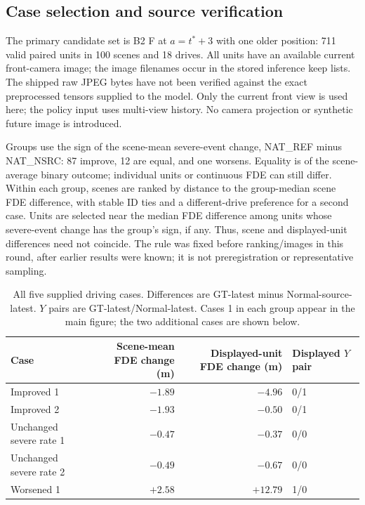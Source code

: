 \subsection{Case selection and source verification}
The primary candidate set is B2 F at $a=t^*+3$ with one older position: 711 valid paired units in 100 scenes and 18 drives. All units have an available current front-camera image; the image filenames occur in the stored inference keep lists. The shipped raw JPEG bytes have not been verified against the exact preprocessed tensors supplied to the model. Only the current front view is used here; the policy input uses multi-view history. No camera projection or synthetic future image is introduced.

Groups use the sign of the scene-mean severe-event change, NAT\_REF minus NAT\_NSRC: 87 improve, 12 are equal, and one worsens. Equality is of the scene-average binary outcome; individual units or continuous FDE can still differ. Within each group, scenes are ranked by distance to the group-median scene FDE difference, with stable ID ties and a different-drive preference for a second case. Units are selected near the median FDE difference among units whose severe-event change has the group's sign, if any. Thus, scene and displayed-unit differences need not coincide. The rule was fixed before ranking/images in this round, after earlier results were known; it is not preregistration or representative sampling.

\begin{table}[ht]
\centering\small
\caption{All five supplied driving cases. Differences are GT-latest minus Normal-source-latest. $Y$ pairs are GT-latest/Normal-latest. Cases 1 in each group appear in the main figure; the two additional cases are shown below.}
\label{tab:cases}
\begin{tabular}{@{}lrrl@{}}\toprule
Case & Scene-mean FDE change (m) & Displayed-unit FDE change (m) & Displayed $Y$ pair\\\midrule
Improved 1 & $-1.89$ & $-4.96$ & 0/1\\
Improved 2 & $-1.93$ & $-0.50$ & 0/1\\
Unchanged severe rate 1 & $-0.47$ & $-0.37$ & 0/0\\
Unchanged severe rate 2 & $-0.49$ & $-0.67$ & 0/0\\
Worsened 1 & $+2.58$ & $+12.79$ & 1/0\\\bottomrule
\end{tabular}
\end{table}

